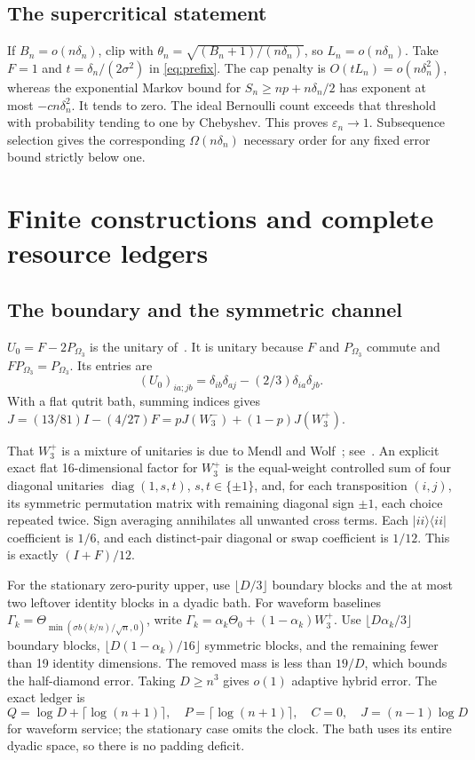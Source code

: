 \documentclass[11pt]{article}
\theoremstyle{definition}
\theoremstyle{remark}
\newcommand{\ket}[1]{\lvert#1\rangle}
\newcommand{\bra}[1]{\langle#1\rvert}
\newcommand{\Wminus}{W_3^-}
\newcommand{\Wplus}{W_3^+}
\newcommand{\eps}{\varepsilon}
\begin{document}
\subsection{The supercritical statement}

If $B_n=o(n\delta_n)$, clip with $\theta_n=\sqrt{(B_n+1)/(n\delta_n)}$, so $L_n=o(n\delta_n)$. Take $F=1$ and $t=\delta_n/(2\sigma^2)$ in \eqref{eq:prefix}. The cap penalty is $O(tL_n)=o(n\delta_n^2)$, whereas the exponential Markov bound for $S_n\ge np+n\delta_n/2$ has exponent at most $-c n\delta_n^2$. It tends to zero. The ideal Bernoulli count exceeds that threshold with probability tending to one by Chebyshev. This proves $\eps_n\to1$. Subsequence selection gives the corresponding $\Omega(n\delta_n)$ necessary order for any fixed error bound strictly below one.

\section{Finite constructions and complete resource ledgers}\label{app:upper}

\subsection{The boundary and the symmetric channel}

$U_0=F-2P_{\Omega_3}$ is the unitary of~\cite[proof of Theorem~5.6(1)]{HM2015}. It is unitary because $F$ and $P_{\Omega_3}$ commute and $FP_{\Omega_3}=P_{\Omega_3}$. Its entries are
\[
 (U_0)_{ia;jb}=\delta_{ib}\delta_{aj}-(2/3)\delta_{ia}\delta_{jb}.
\]
With a flat qutrit bath, summing indices gives $J=(13/81)I-(4/27)F=pJ(\Wminus)+(1-p)J(\Wplus)$.

That $\Wplus$ is a mixture of unitaries is due to Mendl and Wolf~\cite{MendlWolf}; see~\cite[Corollary~4.7(1)]{HM2015}. An explicit exact flat 16-dimensional factor for $\Wplus$ is the equal-weight controlled sum of four diagonal unitaries $\operatorname{diag}(1,s,t)$, $s,t\in\{\pm1\}$, and, for each transposition $(i,j)$, its symmetric permutation matrix with remaining diagonal sign $\pm1$, each choice repeated twice. Sign averaging annihilates all unwanted cross terms. Each $\ket{ii}\bra{ii}$ coefficient is $1/6$, and each distinct-pair diagonal or swap coefficient is $1/12$. This is exactly $(I+F)/12$.

For the stationary zero-purity upper, use $\lfloor D/3\rfloor$ boundary blocks and the at most two leftover identity blocks in a dyadic bath. For waveform baselines $\Gamma_k=\Theta_{\min(\sigma b(k/n)/\sqrt n,0)}$, write $\Gamma_k=\alpha_k\Theta_0+(1-\alpha_k)\Wplus$. Use $\lfloor D\alpha_k/3\rfloor$ boundary blocks, $\lfloor D(1-\alpha_k)/16\rfloor$ symmetric blocks, and the remaining fewer than 19 identity dimensions. The removed mass is less than $19/D$, which bounds the half-diamond error. Taking $D\ge n^3$ gives $o(1)$ adaptive hybrid error. The exact ledger is
\[
 Q=\log D+\lceil\log(n+1)\rceil,\quad
 P=\lceil\log(n+1)\rceil,\quad C=0,\quad J=(n-1)\log D
\]
for waveform service; the stationary case omits the clock. The bath uses its entire dyadic space, so there is no padding deficit.
\end{document}
